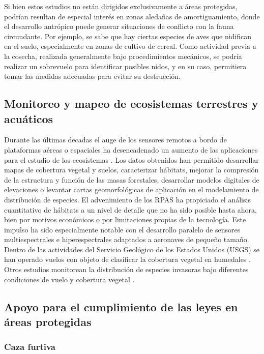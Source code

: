 \documentclass[11pt,]{article}
\begin{document}
Si bien estos estudios no están dirigidos exclusivamente a áreas
protegidas, podrían resultan de especial interés en zonas aledañas de
amortiguamiento, donde el desarrollo antrópico puede generar situaciones
de conflicto con la fauna circundante. Por ejemplo, se sabe que hay
ciertas especies de aves que nidifican en el suelo, especialmente en
zonas de cultivo de cereal. Como actividad previa a la cosecha,
realizada generalmente bajo procedimientos mecánicos, se podría realizar
un sobrevuelo para identificar posibles nidos, y en su caso, permitiera
tomar las medidas adecuadas para evitar su destrucción.

\subsection{Monitoreo y mapeo de ecosistemas terrestres y
acuáticos}\label{monitoreo-y-mapeo-de-ecosistemas-terrestres-y-acuaticos}

Durante las últimas decadas el auge de los sensores remotos a bordo de
plataformas aéreas o espaciales ha desencadenado un aumento de las
aplicaciones para el estudio de los ecosistemas \citep{Wulder2004}. Los
datos obtenidos han permitido desarrollar mapas de cobertura vegetal y
suelos, caracterizar hábitats, mejorar la compresión de la estructura y
función de las masas forestales, desarrollar modelos digitales de
elevaciones o levantar cartas geomorfológicas de aplicación en el
modelamiento de distribución de especies. El advenimiento de los RPAS ha
propiciado el análisis cuantitativo de hábitats a un nivel de detalle
que no ha sido posible hasta ahora, bien por motivos económicos o por
limitaciones propias de la tecnología. Este impulso ha sido
especialmente notable con el desarrollo paralelo de sensores
multiespectrales e hiperespectrales adaptados a aeronaves de pequeño
tamaño. Dentro de las actividades del Servicio Geológico de los Estados
Unidos (USGS) se han operado vuelos con objeto de clasificar la
cobertura vegetal en humedales \citep{USGS2014}. Otros estudios
monitorean la distribución de especies invasoras bajo diferentes
condiciones de vuelo y cobertura vegetal \citep{Perroy2017}.

\subsection{Apoyo para el cumplimiento de las leyes en áreas
protegidas}\label{apoyo-para-el-cumplimiento-de-las-leyes-en-areas-protegidas}

\subsubsection{Caza furtiva}\label{caza-furtiva}
\end{document}

